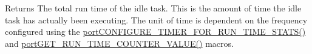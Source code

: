 \begin{DoxyReturn}{Returns}
The total run time of the idle task. This is the amount of time the idle task has actually been executing. The unit of time is dependent on the frequency configured using the \hyperlink{externals_2freertos_2include_2_free_r_t_o_s_8h_a727939bcdb98501e0eba0ec8a1841e1b}{port\+C\+O\+N\+F\+I\+G\+U\+R\+E\+\_\+\+T\+I\+M\+E\+R\+\_\+\+F\+O\+R\+\_\+\+R\+U\+N\+\_\+\+T\+I\+M\+E\+\_\+\+S\+T\+A\+T\+S()} and \hyperlink{externals_2freertos_2portable_2_third_party_2_g_c_c_2_posix_2portmacro_8h_aa7cb8c79fb40bf2d4caccf5ba9ae6737}{port\+G\+E\+T\+\_\+\+R\+U\+N\+\_\+\+T\+I\+M\+E\+\_\+\+C\+O\+U\+N\+T\+E\+R\+\_\+\+V\+A\+L\+U\+E()} macros. 
\end{DoxyReturn}
